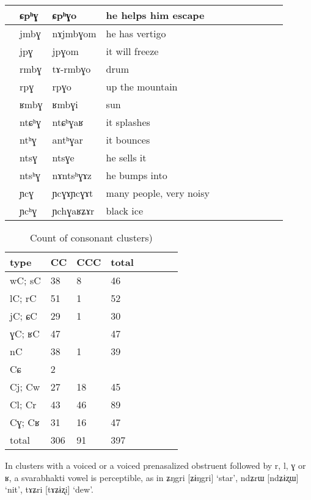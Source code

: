 \documentclass[oldfontcommands,oneside,a4paper,11pt]{article}
\newcommand{\ipa}[1]{{\phon #1}} %
\newcommand{\idph}[1]{\cellcolor{gray}\textbf{#1}}
\begin{document}
\begin{table}
{\begin{tabular}{l|lll|lll|lll|l}
\midrule
&	\ipa{ɕpʰɣ}  &	\ipa{ɕpʰɣo}  &he helps him escape	&&&\\	
\midrule
&	\ipa{jmbɣ}  &	\ipa{nɤjmbɣom}  &	he has vertigo&&&\\	
&	\ipa{jpɣ}  &	\ipa{jpɣom}  &it will freeze	&&&\\	
\midrule
 &	\ipa{rmbɣ}  &	\ipa{tɤ-rmbɣo}  &drum	&&&\\	
&	\ipa{rpɣ}  &	\ipa{rpɣo}  &up the mountain	&&&\\	
\midrule
&	\ipa{ʁmbɣ}  &	\ipa{ʁmbɣi}  &	sun&&&\\	
\midrule
&	\ipa{ntɕʰɣ}  &	\ipa{ntɕʰɣaʁ}  &it splashes	&&&\\	
&	\ipa{ntʰɣ}  &	\ipa{antʰɣar}  &	it bounces&&&\\	
&	\ipa{ntsɣ}  &	\ipa{ntsɣe}  &he sells it	&&&\\	
&	\ipa{ntsʰɣ}  &	\ipa{nɤntsʰɣɤz}  &he bumps into	&&&\\	
&	\ipa{ɲcɣ}\idph{}  &	\ipa{ɲcɣɤɲcɣɤt}  &	many people, very noisy&&&\\	
&	\ipa{ɲcʰɣ}  &	\ipa{ɲchɣaʁʑɤr}  &black ice	&&&\\	
\end{tabular}}
\end{table}	
						
		   \begin{table}
 \caption{Count of consonant clusters)} \label{tab:clusters.tot}  \centering
\begin{tabular}{llllllll}
\toprule		
type &CC& CCC& total\\		
\midrule
wC; sC  & 	38  & 	8  & 	46  & 	\\	
lC; rC  & 	51  & 	1  & 	52  & 	\\	
jC; ɕC  & 	29  & 	1  & 	30  & 	\\	
ɣC; ʁC  & 	47  & 	  & 	47  & 	\\	
nC  & 	38  & 	1  & 	39  & 	\\	
\midrule
Cɕ  & 	2  & 	  & 	  & 	\\	
\midrule
Cj; Cw  & 	27  & 	18  & 	45  & 	\\	
Cl; Cr  & 	43  & 	46  & 	89  & 	\\	
Cɣ; Cʁ  & 	31  & 	16  & 	47  & 	\\	
\midrule
total  & 	306  & 	91  & 	397  & 	\\	
\bottomrule
\end{tabular}
\end{table}
 
In clusters with a voiced or a voiced prenasalized obstruent followed by \ipa{r}, \ipa{l}, \ipa{ɣ} or \ipa{ʁ}, a  svarabhakti vowel is perceptible, as in \ipa{ʑŋgri} [ʑɨŋgri] `star', \ipa{ndʑrɯ} [ndʑɨʐɯ] `nit', \ipa{tɤʑri} [tɤʑɨʐi] `dew'.
 
\end{document}
